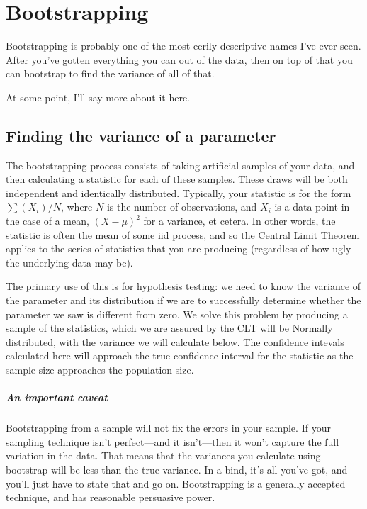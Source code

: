 \chapter{Bootstrapping} \label{boot}

Bootstrapping is probably one of the most eerily descriptive names I've ever seen. 
After you've gotten everything you can out of
the data, then on top of that you can bootstrap to find the variance of all of that.

At some point, I'll say more about it here.

\section{Finding the variance of a parameter}
The bootstrapping process consists of taking artificial samples of your
data, and then calculating a statistic for each of these samples. These
draws will be both independent and identically distributed.  Typically,
your statistic is for the form $\sum (X_i)/ N$, where  $N$ is the number
of observations, and $X_i$ is a data point in the case of a mean,
$(X-\mu)^2$ for a variance, et cetera. In other words, the statistic
is often the mean of some iid process, and so the Central Limit Theorem
applies to the series of statistics that you are producing (regardless
of how ugly the underlying data may be).

The primary use of this is for hypothesis testing: we need to know the
variance of the parameter and its distribution if we are to successfully
determine whether the parameter we saw is different from zero. We
solve this problem by producing a sample of the statistics, which we
are assured by the CLT will be Normally distributed, with the variance
we will calculate below. The confidence intevals calculated here will
approach the true confidence interval for the statistic
as the sample size approaches the population size.

\paragraph{An important caveat} Bootstrapping from a sample will not fix
the errors in your sample. If your sampling technique isn't perfect---and
it isn't---then it won't capture the full variation in the data. That
means that the variances you calculate using bootstrap will be less
than the true variance. In a bind, it's all you've got, and you'll
just have to state that and go on. Bootstrapping is a generally accepted technique, and has reasonable
persuasive power.


